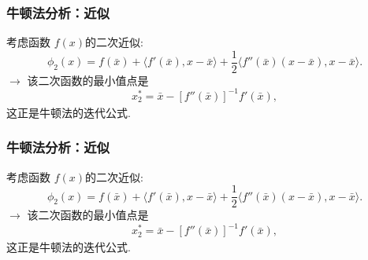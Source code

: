 \documentclass[handout,10pt]{beamer} %
\begin{document}
\begin{frame}[fragile]
\frametitle{牛顿法分析：近似}


 考虑函数 $f(x)$的二次近似:
$$
    \phi_2(x) = f(\bar{x}) + \langle f'(\bar{x}), x-\bar{x}\rangle + \frac{1}{2} \langle f''(\bar{x})(x-\bar{x}), x-\bar{x}\rangle.
$$
$\rightarrow$ 该二次函数的最小值点是
$$
    x_2^* = \bar{x}-[f''(\bar{x})]_{}^{-1} f'(\bar{x}),
$$
这正是牛顿法的迭代公式.



\end{frame}

\begin{frame}[fragile]
\frametitle{牛顿法分析：近似}


 考虑函数 $f(x)$的二次近似:
$$
    \phi_2(x) = f(\bar{x}) + \langle f'(\bar{x}), x-\bar{x}\rangle + \frac{1}{2} \langle f''(\bar{x})(x-\bar{x}), x-\bar{x}\rangle.
$$
$\rightarrow$ 该二次函数的最小值点是
$$
    x_2^* = \bar{x}-[f''(\bar{x})]_{}^{-1} f'(\bar{x}),
$$
这正是牛顿法的迭代公式.



\end{frame}
\end{document}
